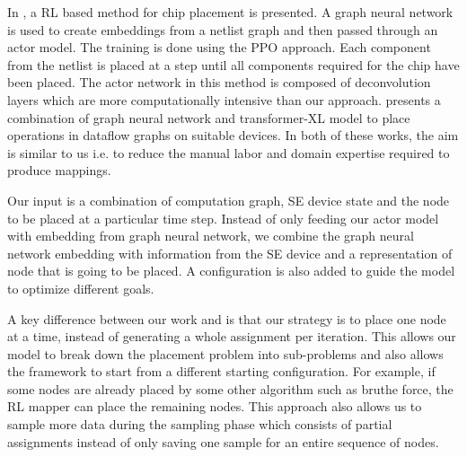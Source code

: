 In \cite{mirhoseini2020chip}, a RL based method for chip placement is presented. A graph neural network is used to create embeddings from a netlist graph and then passed through an actor model. The training is done using the PPO approach. Each component from the netlist is placed at a step until all components required for the chip have been placed. The actor network in this method is composed of deconvolution layers which are more computationally intensive than our approach. 
\cite{zhou2019gdp} presents a combination of graph neural network and transformer-XL model to place operations in dataflow graphs on suitable devices.
In both of these works, the aim is similar to us i.e. to reduce the manual labor and domain expertise required to produce mappings.

Our input is a combination of computation graph, SE device state and the node to be placed at a particular time step. 
Instead of only feeding our actor model with embedding from graph neural network, we combine the graph neural network embedding with information from the SE device and a representation of node that is going to be placed. 
A configuration is also added to guide the model to optimize different goals.

A key difference between our work and \cite{zhou2019gdp} is that our strategy is to place one node at a time, instead of generating a whole assignment per iteration. 
This allows our model to break down the placement problem into sub-problems and also allows the framework to start from a different starting configuration. For example, if some nodes are already placed by some other algorithm such as bruthe force, the RL mapper can place the remaining nodes. 
This approach also allows us to sample more data during the sampling phase which consists of partial assignments instead of only saving one sample for an entire sequence of nodes.  